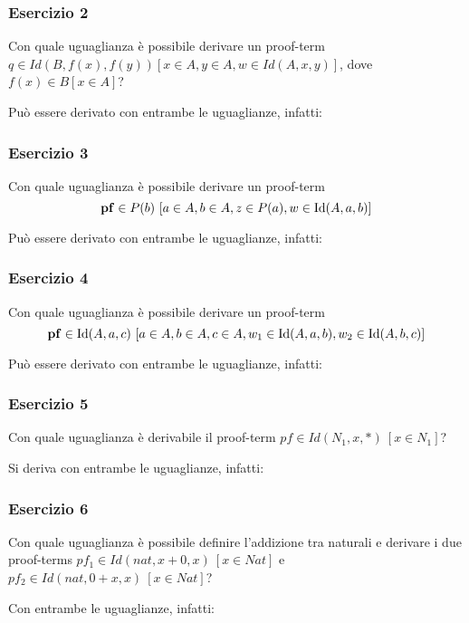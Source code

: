 \subsubsection{Esercizio 2}
\begin{thm}
	Con quale uguaglianza è possibile derivare un proof-term $q\in Id(B, f(x), f(y)) [x\in A, y\in A, w\in Id(A, x, y)]$, dove $f(x)\in B[x\in A]$?
\end{thm}
Può essere derivato con entrambe le uguaglianze, infatti:


\subsubsection{Esercizio 3}
\begin{thm} 
	Con quale uguaglianza è possibile derivare un proof-term
	\[ \mathbf{pf}\in P(b)\ [a\in A, b\in A, z\in P(a), w\in \mathrm{Id}(A, a, b)]\]
\end{thm}
Può essere derivato con entrambe le uguaglianze, infatti:



\subsubsection{Esercizio 4}\label{es4Sez5}
\begin{thm}
	Con quale uguaglianza è possibile derivare un proof-term
	\[ \mathbf{pf} \in \mathrm{Id}(A, a, c)\ [a\in A, b\in A, c\in A, w_1 \in \mathrm{Id}(A, a, b), w_2 \in \mathrm{Id}(A, b, c) ] \]
\end{thm}

Può essere derivato con entrambe le uguaglianze, infatti:



\subsubsection{Esercizio 5}
\begin{thm}
	Con quale uguaglianza è derivabile il proof-term $pf\in Id(N_1, x, \ast)~[x\in N_1]$?
\end{thm}
Si deriva con entrambe le uguaglianze, infatti:


\subsubsection{Esercizio 6}
\begin{thm}
	Con quale uguaglianza è possibile definire l'addizione tra naturali e derivare i due proof-terms $pf_1\in Id(nat, x+0,x)~[x\in Nat]$ e $pf_2\in Id(nat, 0+x,x)~[x\in Nat]$?
\end{thm}
Con entrambe le uguaglianze, infatti:


